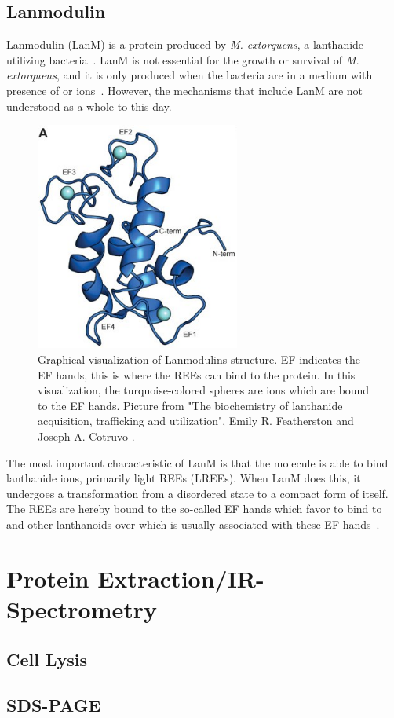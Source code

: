 \subsection{Lanmodulin\authorA}

Lanmodulin (LanM) is a protein produced by \textit{M. extorquens}, a lanthanide-utilizing bacteria~\cite{lanmdiscovery}.
LanM is not essential for the growth or survival of \textit{M. extorquens}, and it is only produced when the bacteria are in a medium with presence of  or  ions~\cite{lanmroleinbiology}.
However, the mechanisms that include LanM are not understood as a whole to this day.

\begin{figure}[H]
    \centering
    \includegraphics[width=0.6\textwidth]{./media/images/lanm_structure}
    \caption{Graphical visualization of Lanmodulins structure. EF indicates the EF hands, this is where the REEs can bind to the protein. In this visualization, the turquoise-colored spheres are  ions which are bound to the EF hands. Picture from "The biochemistry of lanthanide acquisition, trafficking and utilization", Emily R. Featherston and Joseph A. Cotruvo \cite{lanmroleinbiology}.}
    \label{fig:lanm_structure}
\end{figure}

The most important characteristic of LanM is that the molecule is able to bind lanthanide ions, primarily light REEs (LREEs).
When LanM does this, it undergoes a transformation from a disordered state to a compact form of itself.
The REEs are hereby bound to the so-called EF hands which favor to bind to  and other lanthanoids over  which is usually associated with these EF-hands~\cite{lanmstructure}.


\section{Protein Extraction/IR-Spectrometry\authorB{}}


\subsection{Cell Lysis}

\subsection{SDS-PAGE}
